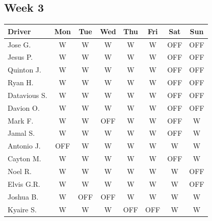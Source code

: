 \documentclass[11pt]{article}
\begin{document}
\subsection{Week 3}
\label{sec:orgcac660c}
\begin{center}
\begin{tabular}{l c c c c c c c}
\toprule
Driver & Mon & Tue & Wed & Thu & Fri & Sat & Sun\\
\midrule
Jose G. & W & W & W & W & W & OFF & OFF\\
Jesus P. & W & W & W & W & W & OFF & OFF\\
Quinton J. & W & W & W & W & W & OFF & OFF\\
Ryan H. & W & W & W & W & W & OFF & OFF\\
Datavious S. & W & W & W & W & W & OFF & OFF\\
Davion O. & W & W & W & W & W & OFF & OFF\\
Mark F. & W & W & OFF & W & W & OFF & W\\
Jamal S. & W & W & W & W & W & OFF & W\\
Antonio J. & OFF & W & W & W & W & W & W\\
Cayton M. & W & W & W & W & W & OFF & W\\
Noel R. & W & W & W & W & W & W & OFF\\
Elvis G.R. & W & W & W & W & W & W & OFF\\
Joshua B. & W & OFF & OFF & W & W & W & W\\
Kyaire S. & W & W & W & OFF & OFF & W & W\\
\bottomrule
\end{tabular}
\end{center}
\end{document}
